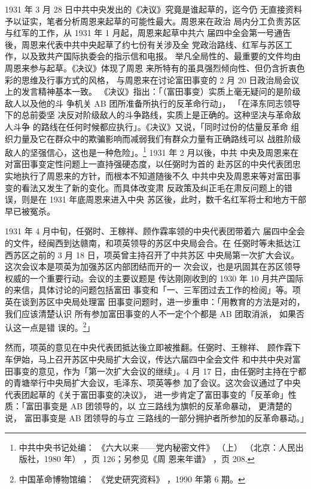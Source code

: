 1931 年 3 月 28 日中共中央发出的《决议》究竟是谁起草的，迄今仍
无直接资料予以证实，笔者分析周恩来起草的可能性最大。周恩来在政治
局内分工负责苏区与红军的工作，从 1931 年 1 月起，周恩来起草中共六
届四中全会第一号通告後，周恩来代表中共中央起草了约七份有关涉及全
党政治路线、红军与苏区工作，以及致共产国际执委会的指示信和电报。
举凡全局性的、最重要的文件均由周恩来参与起草。《决议》体现了周恩
来所特有的虽具强烈倾向性、但仍含折衷色彩的思维及行事方式的风格，
与周恩来在讨论富田事变的 2 月 20 日政治局会议上的发言精神基本一致。
《决议》指出：「（富田事变）实质上毫无疑问的是阶级敌人以及他的斗
争机关 AB 团所准备所执行的反革命行动」，
「在泽东同志领导下的总前委坚
决反对阶级敌人的斗争路线，实质上是正确的。这种坚决与革命敌人斗争
的路线在任何时候都应执行」。《决议》又说，「同时过份的估量反革命
组织力量及它在群众中的欺骗影响而减弱我们有群众力量有正确路线可以
战胜阶级敌人的坚强信心，这也是一种危险」。\footnote{ 中共中央书记处编：
《六大以来——党内秘密文件》
（上）
（北京：人民出版社，1980 年）
，页 126；另参见《周
恩来年谱》
，页 208.} 1931 年 2 月以後，中共
中央及周恩来在对富田事变定性问题上一直持强硬态度，以任弼时为首的
赴苏区的中央代表团忠实地执行了周恩来的方针，而根本不知道随後不久
中共中央及周恩来等对富田事变的看法又发生了新的变化。而具体改变肃
反政策及纠正毛在肃反问题上的错误，则是在 1931 年底周恩来进入中央
苏区後，此时，数千名红军将士和地方干部早已被冤杀。

1931 年 4 月中旬，任弼时、王稼祥、顾作霖率领的中央代表团带着六
届四中全会的文件，经闽西到达赣南，和项英领导的苏区中央局会合。在
任弼时等未抵达江西苏区之前的 3 月 18 日，项英曾主持召开了中共苏区
中央局第一次扩大会议。这次会议本是项英为加强苏区内部团结而开的一
次会议，也是巩固其在苏区领导权威的一个重要行动。会议的主要议题是
传达刚刚收到的 1930 年 10 月共产国际的来信，具体讨论的问题包括富田
事变和「一、三军团过去工作的检阅」等。项英在谈到苏区中央局处理富
田事变问题时，进一步重申：「用教育的方法是对的，我们应该清楚认识
所有参加富田事变的人不一定个个都是 AB 团取消派，
如果否认这一点是错
误的。\footnote{ 中国革命博物馆编：
《党史研究资料》
，1990 年第 6 期。}」

然而，项英的意见在中央代表团抵达後立即被推翻。任弼时、王稼祥、
顾作霖下车伊始，马上召开苏区中央局扩大会议，传达六届四中全会文件
和中共中央对富田事变的意见，作为「第一次扩大会议的继续」。4 月 17
日，由任弼时主持在宁都的青塘举行中央局扩大会议，毛泽东、项英等参
加了会议。这次会议通过了中央代表团起草的《关于富田事变的决议》，
进一步肯定了富田事变的「反革命」性质：「富田事变是 AB 团领导的，以
立三路线为旗帜的反革命暴动，
更清楚的说，
富田事变是 AB 团领导的与立
三路线的一部分拥护者所参加的反革命暴动。」

